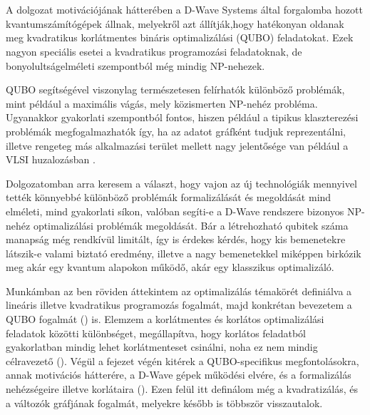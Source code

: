 
\chapter{\bevezetes}

A dolgozat motivációjának hátterében a D-Wave Systems által forgalomba hozott kvantumszámítógépek állnak, melyekről azt állítják,hogy hatékonyan oldanak meg kvadratikus korlátmentes bináris optimalizálási (QUBO) feladatokat. Ezek nagyon speciális esetei a kvadratikus programozási feladatoknak, de bonyolultságelméleti szempontból még mindig NP-nehezek.

QUBO segítségével viszonylag természetesen felírhatók különböző problémák, mint például a maximális vágás, mely közismerten NP-nehéz probléma. Ugyanakkor gyakorlati szempontból fontos, hiszen például a tipikus klaszterezési problémák megfogalmazhatók így, ha az adatot gráfként tudjuk reprezentálni, illetve rengeteg más alkalmazási terület mellett nagy jelentősége van például a VLSI huzalozásban \cite{wiki:VLSI}\cite{wiki:Maximum_cut}.

Dolgozatomban arra keresem a választ, hogy vajon az új technológiák mennyivel tették könnyebbé különböző problémák formalizálását és megoldását mind elméleti, mind gyakorlati síkon, valóban segíti-e a D-Wave rendszere bizonyos NP-nehéz optimalizálási problémák megoldását. Bár a létrehozható qubitek száma manapság még rendkívül limitált, így is érdekes kérdés, hogy kis bemenetekre látszik-e valami biztató eredmény, illetve a nagy bemenetekkel miképpen birkózik meg akár egy kvantum alapokon működő, akár egy klasszikus optimalizáló.

Munkámban az ben röviden áttekintem az optimalizálás témakörét definiálva a lineáris illetve kvadratikus programozás fogalmát, majd konkrétan bevezetem a QUBO fogalmát () is. Elemzem a korlátmentes és korlátos optimalizálási feladatok közötti különbséget, megállapítva, hogy korlátos feladatból gyakorlatban mindig lehet korlátmenteset csinálni, noha ez nem mindig célravezető ().
Végül a fejezet végén kitérek a QUBO-specifikus megfontolásokra, annak motivációs hátterére, a D-Wave gépek működési elvére, és a formalizálás nehézségeire illetve korlátaira (). Ezen felül itt definálom még a kvadratizálás, és a változók gráfjának fogalmát, melyekre később is többször visszautalok.


